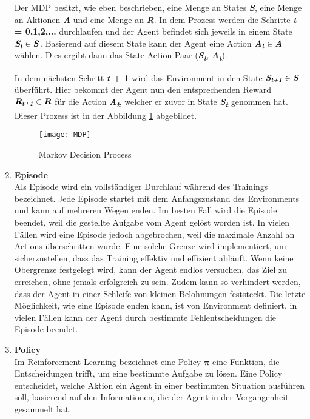\begin{enumerate}
    Der MDP besitzt, wie eben beschrieben, eine Menge an States \textbf{\textit{S}}, eine Menge an Aktionen \textbf{\textit{A}} und eine Menge an \textbf{\textit{R}}.
    In dem Prozess werden die Schritte \textbf{\textit{t} = 0,1,2,...} durchlaufen und der Agent befindet sich jeweils in einem State $ \text{\textbf{\textit{S\textsubscript{t}}}}\in \text{\textbf{\textit{S}}}$. 
    Basierend auf diesem State kann der Agent eine Action $ \text{\textbf{\textit{A\textsubscript{t}}}}\in \text{\textbf{\textit{A}}}$ wählen. Dies ergibt dann das State-Action Paar (\textbf{\textit{S\textsubscript{t}}}, \textbf{\textit{A\textsubscript{t}}}).

    In dem nächsten Schritt \textbf{\textit{t} + 1} wird das Environment in den State $ \text{\textbf{\textit{S\textsubscript{t+1}}}}\in \text{\textbf{\textit{S}}}$ überführt.
    Hier bekommt der Agent nun den entsprechenden Reward $ \text{\textbf{\textit{R\textsubscript{t+1}}}}\in \text{\textbf{\textit{R}}}$ für die Action \textbf{\textit{A\textsubscript{t}}},
    welcher er zuvor in State \textbf{\textit{S\textsubscript{t}}} genommen hat. Dieser Prozess ist in der Abbildung \ref{MDP} abgebildet.


    \begin{figure}
        \texttt{[image: MDP]}
        \caption{Markov Decision Process}
        \label{MDP}
    \end{figure}
    \item \textbf{Episode}\\
    Als Episode wird ein vollständiger Durchlauf während des Trainings bezeichnet. Jede Episode startet mit dem Anfangszustand des Environments und kann auf mehreren Wegen enden. Im besten Fall wird die Episode beendet, weil die gestellte Aufgabe vom Agent gelöst worden ist. In vielen Fällen wird eine Episode jedoch abgebrochen, weil die maximale Anzahl an Actions überschritten wurde. Eine solche Grenze wird implementiert, um sicherzustellen, dass das Training effektiv und effizient abläuft. Wenn keine Obergrenze festgelegt wird, kann der Agent endlos versuchen, das Ziel zu erreichen, ohne jemals erfolgreich zu sein. Zudem kann so verhindert werden, dass der Agent in einer Schleife von kleinen Belohnungen feststeckt. Die letzte Möglichkeit, wie eine Episode enden kann, ist von Environment definiert, in vielen Fällen kann der Agent durch bestimmte Fehlentscheidungen die Episode beendet.
    
    \item \textbf{Policy}\\
    Im Reinforcement Learning bezeichnet eine Policy {$\bm{\pi}$} eine Funktion, die Entscheidungen trifft, um eine bestimmte Aufgabe zu lösen. Eine Policy entscheidet, welche Aktion ein Agent in einer bestimmten Situation ausführen soll, basierend auf den Informationen, die der Agent in der Vergangenheit gesammelt hat.


\end{enumerate}
